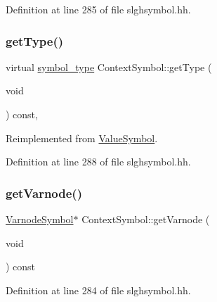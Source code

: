 Definition at line 285 of file slghsymbol.\+hh.

\mbox{\label{class_context_symbol_ab732b095055fe2b48f4ffccdce790f60}} 
\subsubsection{\texorpdfstring{getType()}{getType()}}
{\footnotesize\ttfamily virtual \mbox{\hyperlink{class_sleigh_symbol_aba70f7f332fd63488c5ec4bd7807db41}{symbol\+\_\+type}} Context\+Symbol\+::get\+Type (\begin{DoxyParamCaption}\item[{void}]{ }\end{DoxyParamCaption}) const\hspace{0.3cm}{\ttfamily [inline]}, {\ttfamily [virtual]}}



Reimplemented from \mbox{\hyperlink{class_value_symbol_aa134aca647315ca414f6e4e4a246c9ae}{Value\+Symbol}}.



Definition at line 288 of file slghsymbol.\+hh.

\mbox{\label{class_context_symbol_a572d945395d5e8d456c7a61f378b2db4}} 
\subsubsection{\texorpdfstring{getVarnode()}{getVarnode()}}
{\footnotesize\ttfamily \mbox{\hyperlink{class_varnode_symbol}{Varnode\+Symbol}}$\ast$ Context\+Symbol\+::get\+Varnode (\begin{DoxyParamCaption}\item[{void}]{ }\end{DoxyParamCaption}) const\hspace{0.3cm}{\ttfamily [inline]}}



Definition at line 284 of file slghsymbol.\+hh.

\mbox{\label{class_context_symbol_a3ea7d156033d1dc82c9c3452496641a9}} 
